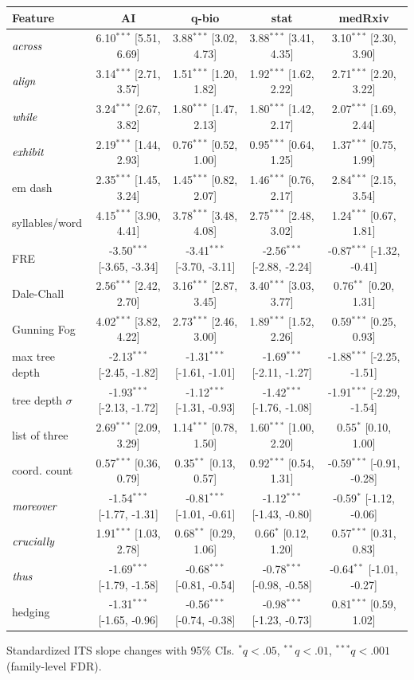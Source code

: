 \begin{tabular}{lcccc}
\toprule
Feature & AI & q-bio & stat & medRxiv \\
\midrule
$\it{across}$ & 6.10$^{***}$ [5.51, 6.69] & 3.88$^{***}$ [3.02, 4.73] & 3.88$^{***}$ [3.41, 4.35] & 3.10$^{***}$ [2.30, 3.90] \\
$\it{align}$ & 3.14$^{***}$ [2.71, 3.57] & 1.51$^{***}$ [1.20, 1.82] & 1.92$^{***}$ [1.62, 2.22] & 2.71$^{***}$ [2.20, 3.22] \\
$\it{while}$ & 3.24$^{***}$ [2.67, 3.82] & 1.80$^{***}$ [1.47, 2.13] & 1.80$^{***}$ [1.42, 2.17] & 2.07$^{***}$ [1.69, 2.44] \\
$\it{exhibit}$ & 2.19$^{***}$ [1.44, 2.93] & 0.76$^{***}$ [0.52, 1.00] & 0.95$^{***}$ [0.64, 1.25] & 1.37$^{***}$ [0.75, 1.99] \\
\addlinespace[2pt]
em dash & 2.35$^{***}$ [1.45, 3.24] & 1.45$^{***}$ [0.82, 2.07] & 1.46$^{***}$ [0.76, 2.17] & 2.84$^{***}$ [2.15, 3.54] \\
\addlinespace[2pt]
syllables/word & 4.15$^{***}$ [3.90, 4.41] & 3.78$^{***}$ [3.48, 4.08] & 2.75$^{***}$ [2.48, 3.02] & 1.24$^{***}$ [0.67, 1.81] \\
FRE & -3.50$^{***}$ [-3.65, -3.34] & -3.41$^{***}$ [-3.70, -3.11] & -2.56$^{***}$ [-2.88, -2.24] & -0.87$^{***}$ [-1.32, -0.41] \\
Dale-Chall & 2.56$^{***}$ [2.42, 2.70] & 3.16$^{***}$ [2.87, 3.45] & 3.40$^{***}$ [3.03, 3.77] & 0.76$^{**}$ [0.20, 1.31] \\
Gunning Fog & 4.02$^{***}$ [3.82, 4.22] & 2.73$^{***}$ [2.46, 3.00] & 1.89$^{***}$ [1.52, 2.26] & 0.59$^{***}$ [0.25, 0.93] \\
\addlinespace[2pt]
max tree depth & -2.13$^{***}$ [-2.45, -1.82] & -1.31$^{***}$ [-1.61, -1.01] & -1.69$^{***}$ [-2.11, -1.27] & -1.88$^{***}$ [-2.25, -1.51] \\
tree depth $\sigma$ & -1.93$^{***}$ [-2.13, -1.72] & -1.12$^{***}$ [-1.31, -0.93] & -1.42$^{***}$ [-1.76, -1.08] & -1.91$^{***}$ [-2.29, -1.54] \\
list of three & 2.69$^{***}$ [2.09, 3.29] & 1.14$^{***}$ [0.78, 1.50] & 1.60$^{***}$ [1.00, 2.20] & 0.55$^{*}$ [0.10, 1.00] \\
coord. count & 0.57$^{***}$ [0.36, 0.79] & 0.35$^{**}$ [0.13, 0.57] & 0.92$^{***}$ [0.54, 1.31] & -0.59$^{***}$ [-0.91, -0.28] \\
\addlinespace[2pt]
$\it{moreover}$ & -1.54$^{***}$ [-1.77, -1.31] & -0.81$^{***}$ [-1.01, -0.61] & -1.12$^{***}$ [-1.43, -0.80] & -0.59$^{*}$ [-1.12, -0.06] \\
$\it{crucially}$ & 1.91$^{***}$ [1.03, 2.78] & 0.68$^{**}$ [0.29, 1.06] & 0.66$^{*}$ [0.12, 1.20] & 0.57$^{***}$ [0.31, 0.83] \\
$\it{thus}$ & -1.69$^{***}$ [-1.79, -1.58] & -0.68$^{***}$ [-0.81, -0.54] & -0.78$^{***}$ [-0.98, -0.58] & -0.64$^{**}$ [-1.01, -0.27] \\
hedging & -1.31$^{***}$ [-1.65, -0.96] & -0.56$^{***}$ [-0.74, -0.38] & -0.98$^{***}$ [-1.23, -0.73] & 0.81$^{***}$ [0.59, 1.02] \\
\bottomrule
\end{tabular}
\begin{flushleft}\footnotesize Standardized ITS slope changes with 95\% CIs. $^{*}q<.05$, $^{**}q<.01$, $^{***}q<.001$ (family-level FDR).\end{flushleft}
